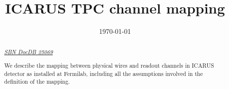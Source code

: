 \documentclass{article}
\title{ICARUS TPC channel mapping}
\date{\today}
\begin{document}

\maketitle

\begin{abstract}
\centerline{\large\emph{\href{https://sbn-docdb.fnal.gov/cgi-bin/sso/ShowDocument?docid=25068}{SBN DocDB 25069}}}

We describe the mapping between physical wires and readout channels in ICARUS detector as installed at Fermilab, including all the assumptions involved in the definition of the mapping.
\end{abstract}

\tableofcontents


















\end{document}
